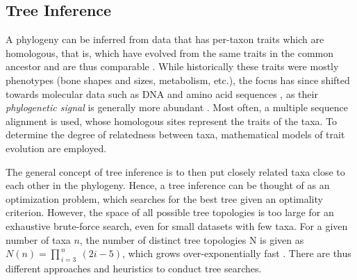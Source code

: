 
\subsection{Tree Inference}
\label{ch:Foundations:sec:TreeOfLife:sub:TreeInference}

A phylogeny can be inferred from data that has per-taxon traits which are homologous,
that is, which have evolved from the same traits in the common ancestor and are thus comparable \cite{Felsenstein2004,Yang2006}.
While historically these traits were mostly phenotypes (bone shapes and sizes, metabolism, etc.),
the focus has since shifted towards molecular data such as DNA and amino acid sequences \cite{Zuckerkandl1965},
as their \emph{phylogenetic signal} is generally more abundant \cite{Hillis2000}.
Most often, a multiple sequence alignment is used,
whose homologous sites represent the traits of the taxa.
To determine the degree of relatedness between taxa, mathematical models of trait evolution are employed.

The general concept of tree inference is to then put closely related taxa close to each other in the phylogeny.
Hence, a tree inference can be thought of as an optimization problem,
which searches for the best tree given an optimality criterion.
However, the space of all possible tree topologies is too large for an exhaustive brute-force search,
even for small datasets with few taxa.
For a given number of taxa $n$, the number of distinct tree topologies N is given as
$N(n) = \prod_{\,i=3}^{\,n} ~(2i - 5)$,
which grows over-exponentially fast \cite{Felsenstein2004}.
There are thus different approaches and heuristics to conduct tree searches.

